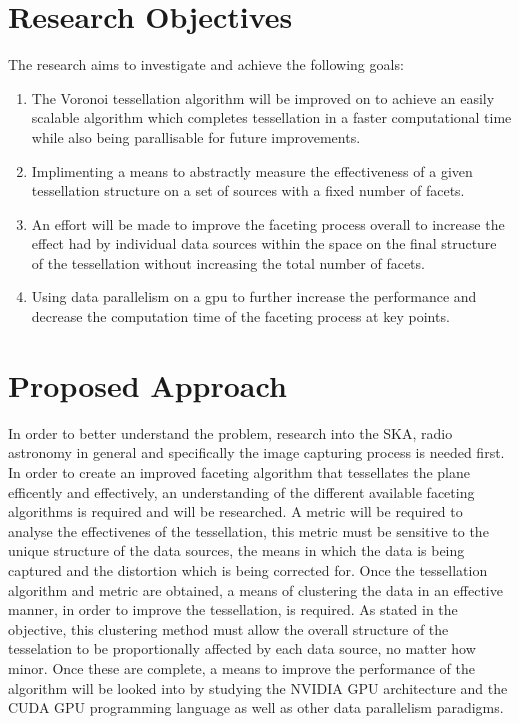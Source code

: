 \section{Research Objectives}
The research aims to investigate and achieve the following goals:
\begin{enumerate}
\item The Voronoi tessellation algorithm will be improved on to achieve an easily scalable algorithm which completes tessellation in a faster computational time while also being parallisable for future improvements.
\item Implimenting a means to abstractly measure the effectiveness of a given tessellation structure on a set of sources with a fixed number of facets.
\item An effort will be made to improve the faceting process overall to increase the effect had by individual data sources within the space on the final structure of the tessellation without increasing the total number of facets.
\item Using data parallelism on a \gls{gpu} to further increase the performance and decrease the computation time of the faceting process at key points.
\end{enumerate}
\section{Proposed Approach}
In order to better understand the problem, research into the SKA, radio astronomy in general and specifically the image capturing process is needed first. In order to create an improved faceting algorithm that tessellates the plane efficently and effectively, an understanding of the different available faceting algorithms is required and will be researched. A metric will be required to analyse the effectivenes of the tessellation, this metric must be sensitive to the unique structure of the data sources, the means in which the data is being captured and the distortion which is being corrected for. Once the tessellation algorithm and metric are obtained, a means of clustering the data in an effective manner, in order to improve the tessellation, is required. As stated in the objective, this clustering method must allow the overall structure of the tesselation to be proportionally affected by each data source, no matter how minor. Once these are complete, a means to improve the performance of the algorithm will be looked into by studying the NVIDIA GPU architecture and the CUDA GPU programming language as well as other data parallelism paradigms.
